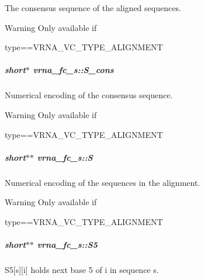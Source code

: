 The consensus sequence of the aligned sequences. 

\begin{DoxyWarning}{Warning}
Only available if\begin{DoxyVerb}type==VRNA_VC_TYPE_ALIGNMENT \end{DoxyVerb}
 
\end{DoxyWarning}
\subparagraph[{\texorpdfstring{S\+\_\+cons}{S_cons}}]{\setlength{\rightskip}{0pt plus 5cm}short$\ast$ vrna\+\_\+fc\+\_\+s\+::\+S\+\_\+cons}\hypertarget{group__fold__compound_aa3fab7ae38ebfed2028375221d295686}{}\label{group__fold__compound_aa3fab7ae38ebfed2028375221d295686}


Numerical encoding of the consensus sequence. 

\begin{DoxyWarning}{Warning}
Only available if\begin{DoxyVerb}type==VRNA_VC_TYPE_ALIGNMENT \end{DoxyVerb}
 
\end{DoxyWarning}
\subparagraph[{\texorpdfstring{S}{S}}]{\setlength{\rightskip}{0pt plus 5cm}short$\ast$$\ast$ vrna\+\_\+fc\+\_\+s\+::S}\hypertarget{group__fold__compound_aebb37297f92c7bd22aac6343f8f61d61}{}\label{group__fold__compound_aebb37297f92c7bd22aac6343f8f61d61}


Numerical encoding of the sequences in the alignment. 

\begin{DoxyWarning}{Warning}
Only available if\begin{DoxyVerb}type==VRNA_VC_TYPE_ALIGNMENT \end{DoxyVerb}
 
\end{DoxyWarning}
\subparagraph[{\texorpdfstring{S5}{S5}}]{\setlength{\rightskip}{0pt plus 5cm}short$\ast$$\ast$ vrna\+\_\+fc\+\_\+s\+::\+S5}\hypertarget{group__fold__compound_a78d089b475e2230bd536b9a6ed8bb17c}{}\label{group__fold__compound_a78d089b475e2230bd536b9a6ed8bb17c}


S5\mbox{[}s\mbox{]}\mbox{[}i\mbox{]} holds next base 5\textquotesingle{} of i in sequence s. 

